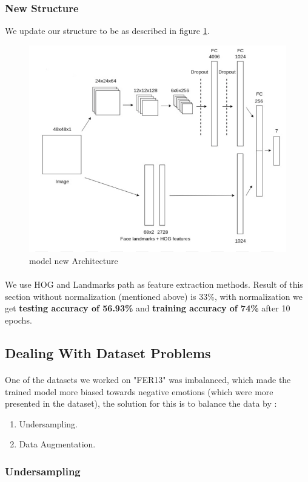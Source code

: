 \subsubsection{New Structure}
We update our structure to be as described in figure \ref{arch}.
\begin{figure}
	\centering
	\includegraphics[width=.7\textwidth]{images/Arch.png}
	\caption{model new Architecture}
	\label{arch}
\end{figure} 
\paragraph{}
We use HOG and Landmarks path as feature extraction methods.\newline
Result of this section without normalization (mentioned above) is 33\%,
with normalization we get \textbf{testing accuracy of 56.93\%} and \textbf{training accuracy of 74\%} after 10 epochs. 

\subsection{Dealing With Dataset Problems}
\paragraph{}
One of the datasets we worked on "FER13" was imbalanced, which made the trained model more biased towards negative emotions (which were more presented in the dataset), the solution for this is to balance the data by :
\begin{enumerate}
	\item Undersampling.
	\item Data Augmentation.
\end{enumerate}
\subsubsection{Undersampling}
